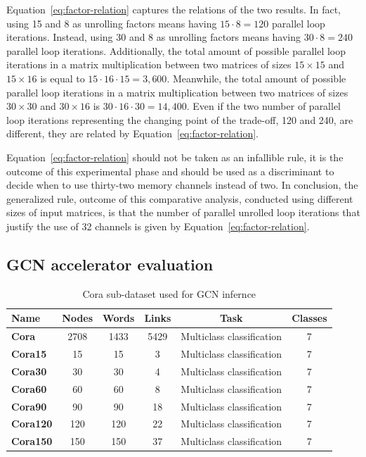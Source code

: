 Equation~\ref{eq:factor-relation} captures the relations of the two results.
In fact, using 15 and 8 as unrolling factors means having $15 \cdot 8 = 120$ parallel loop iterations.
Instead, using 30 and 8 as unrolling factors means having $30 \cdot 8 = 240$ parallel loop iterations.
Additionally, the total amount of possible parallel loop iterations in a matrix multiplication between two matrices of sizes $15\times15$ and $15\times16$ is equal to $15 \cdot 16 \cdot 15 = 3,600$.
Meanwhile, the total amount of possible parallel loop iterations in a matrix multiplication between two matrices of sizes $30\times30$ and $30\times16$ is $30 \cdot 16 \cdot 30 = 14,400$.
Even if the two number of parallel loop iterations representing the changing point of the trade-off, 120 and 240, are different, they are related by Equation~\ref{eq:factor-relation}.

Equation~\ref{eq:factor-relation} should not be taken as an infallible rule, it is the outcome of this experimental phase and should be used as a discriminant to decide when to use thirty-two memory channels instead of two.
In conclusion, the generalized rule, outcome of this comparative analysis, conducted using different sizes of input matrices, is that the number of parallel unrolled loop iterations that justify the use of 32 channels is given by Equation~\ref{eq:factor-relation}.

\subsection{GCN accelerator evaluation}
\label{subsec:gcn_accelerator_evaluation}%

\begin{table}[t]
\centering
    \begin{tabular}{|p{4em} c c c c c|}
    \hline
    \textbf{Name} & \textbf{Nodes} & \textbf{Words} & \textbf{Links} & \textbf{Task} & \textbf{Classes} \T\B \\
    \hline \hline
    \textbf{Cora} & 2708  & 1433 & 5429 & Multiclass classification & 7 \T\B\\
    \hline
    \textbf{Cora15} & 15  & 15 & 3 & Multiclass classification & 7 \T\B\\
    \hline
    \textbf{Cora30} & 30  & 30 & 4 & Multiclass classification & 7 \T\B\\
    \hline
    \textbf{Cora60} & 60  & 60 & 8 & Multiclass classification & 7 \T\B\\
    \hline
    \textbf{Cora90} & 90  & 90 & 18 & Multiclass classification & 7 \T\B\\
    \hline
    \textbf{Cora120} & 120  & 120 & 22 & Multiclass classification & 7 \T\B\\
    \hline
    \textbf{Cora150} & 150  & 150 & 37 & Multiclass classification & 7 \T\B\\
    \hline
    \end{tabular}
    \\[10pt]
    \caption{Cora sub-dataset used for GCN infernce}
    \label{tab:dataset-definition}
\end{table}

